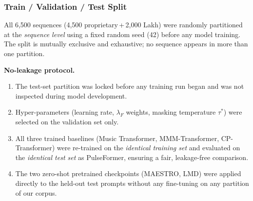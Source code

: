 \documentclass[conference]{IEEEtran}
\begin{document}
\subsubsection*{Train / Validation / Test Split}

All 6,500 sequences (4,500 proprietary\,+\,2,000 Lakh) were randomly
partitioned at the \emph{sequence level} using a fixed random seed (42)
before any model training.
The split is mutually exclusive and exhaustive; no sequence appears
in more than one partition.

\begin{table}[ht]
\centering\small
\caption{Dataset partition summary. All models and all baselines were
  evaluated exclusively on the held-out test set.
  No hyper-parameter selection or early stopping used test-set labels.}
\label{tab:split}
\end{table}

\noindent\textbf{No-leakage protocol.}
\begin{enumerate}[nosep,leftmargin=*]
  \item The test-set partition was locked before any training run began
        and was not inspected during model development.
  \item Hyper-parameters (learning rate, $\lambda_F$ weights, masking
        temperature $\tau^*$) were selected on the validation set only.
  \item All three trained baselines (Music Transformer, MMM-Transformer,
        CP-Transformer) were re-trained on the \emph{identical training set}
        and evaluated on the \emph{identical test set} as PulseFormer,
        ensuring a fair, leakage-free comparison.
  \item The two zero-shot pretrained checkpoints (MAESTRO, LMD) were
        applied directly to the held-out test prompts without any fine-tuning
        on any partition of our corpus.
\end{enumerate}
\end{document}
